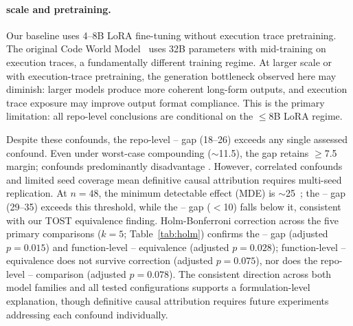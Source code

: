\paragraph{\cwm{} scale and pretraining.} Our \cwm{} baseline uses 4--8B LoRA fine-tuning without execution trace pretraining. The original Code World Model~\cite{meta2025cwm} uses 32B parameters with mid-training on execution traces, a fundamentally different training regime. At larger scale or with execution-trace pretraining, the generation bottleneck observed here may diminish: larger models produce more coherent long-form outputs, and execution trace exposure may improve output format compliance. This is the primary limitation: all repo-level \cwm{} conclusions are conditional on the ${\leq}$8B LoRA regime.

Despite these confounds, the repo-level \cls{}--\cwm{} gap (18--26\pp{}) exceeds any single assessed confound. Even under worst-case compounding (${\sim}$11.5\pp{}), the gap retains ${\geq}$7.5\pp{} margin; confounds predominantly disadvantage \cwm{}. However, correlated confounds and limited seed coverage mean definitive causal attribution requires multi-seed replication. At $n{=}48$, the minimum detectable effect (MDE) is ${\sim}$25\pp{}~\cite{hoenig2001}; the \cls{}--\cwm{} gap (29--35\pp{}) exceeds this threshold, while the \cls{}--\traj{} gap ($<$10\pp{}) falls below it, consistent with our TOST equivalence finding. Holm-Bonferroni correction across the five primary comparisons ($k{=}5$; Table~\ref{tab:holm}) confirms the \cls{}--\cwm{} gap (adjusted $p{=}0.015$) and function-level \cls{}--\cwm{} equivalence (adjusted $p{=}0.028$); function-level \cls{}--\traj{} equivalence does not survive correction (adjusted $p{=}0.075$), nor does the repo-level \cwm{}--\traj{} comparison (adjusted $p{=}0.078$). The consistent direction across both model families and all tested configurations supports a formulation-level explanation, though definitive causal attribution requires future experiments addressing each confound individually.


